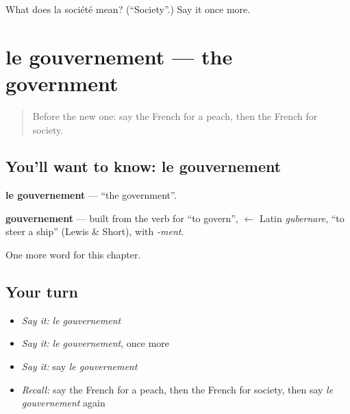 \begin{tcolorbox}[breakable,colback=teal!4,colframe=teal!35!black,title={Before you move on}]
What does la société mean? (\textquotedblleft{}Society\textquotedblright{}.) Say it once more.
\end{tcolorbox}
\section[le gouvernement]{le gouvernement — the government}

\label{lesson:FR-C222-gouvernement}



\begin{quote}
Before the new one: say the French for a peach, then the French for society.
\end{quote}

\subsection*{You'll want to know: le gouvernement}
\textbf{le gouvernement} — \textquotedblleft{}the government\textquotedblright{}.

\begin{cousinweb}
\textbf{gouvernement} — built from the verb for \textquotedblleft{}to govern\textquotedblright{}, $\leftarrow$ Latin \emph{gubernare}, \textquotedblleft{}to steer a ship\textquotedblright{} (Lewis \& Short), with \emph{-ment}.
\end{cousinweb}

\begin{grammarlens}[title={What you've built}]
One more word for this chapter.
\end{grammarlens}

\subsection*{Your turn}
\begin{itemize}
\raggedright
  \item \emph{Say it:} \emph{le gouvernement}
  \item \emph{Say it:} \emph{le gouvernement}, once more
  \item \emph{Say it:} say \emph{le gouvernement}
  \item \emph{Recall:} say the French for a peach, then the French for society, then say \emph{le gouvernement} again
\end{itemize}

